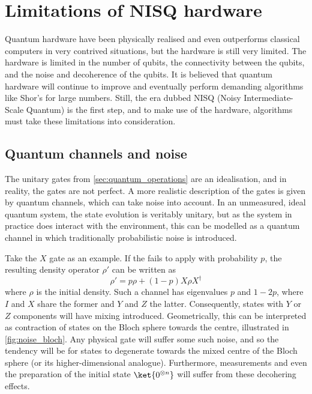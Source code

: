 \section{Limitations of NISQ hardware}
Quantum hardware have been physically realised and even outperforms classical computers in very contrived situations, but the hardware is still very limited.
The hardware is limited in the number of qubits, the connectivity between the qubits, and the noise and decoherence of the qubits.
It is believed that quantum hardware will continue to improve and eventually perform demanding algorithms like Shor's for large numbers.
Still, the era dubbed NISQ (Noisy Intermediate-Scale Quantum) is the first step, and to make use of the hardware, algorithms must take these limitations into consideration.

\subsection{Quantum channels and noise}
The unitary gates from \cref{sec:quantum_operations} are an idealisation, and in reality, the gates are not perfect.
A more realistic description of the gates is given by quantum channels, which can take noise into account.
In an unmeasured, ideal quantum system, the state evolution is veritably unitary, but as the system in practice does interact with the environment, this can be modelled as a quantum channel in which traditionally probabilistic noise is introduced.

Take the $X$ gate as an example.
If the fails to apply with probability $p$, the resulting density operator $\rho'$ can be written as
\begin{equation}
    \rho' = p\rho + (1-p)X\rho X^\dagger
\end{equation}
where $\rho$ is the initial density.
Such a channel has eigenvalues $p$ and $1-2p$, where $I$ and $X$ share the former and $Y$ and $Z$ the latter.
Consequently, states with $Y$ or $Z$ components will have mixing introduced.
Geometrically, this can be interpreted as contraction of states on the Bloch sphere towards the centre, illustrated in \cref{fig:noise_bloch}.
Any physical gate will suffer some such noise, and so the tendency will be for states to degenerate towards the mixed centre of the Bloch sphere (or its higher-dimensional analogue).
Furthermore, measurements and even the preparation of the initial state $\ket{0^{\otimes n}}$
will suffer from these decohering effects.

